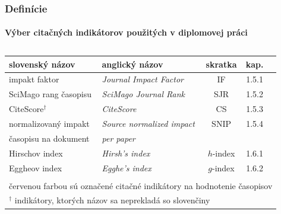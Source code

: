 \documentclass{beamer}
\begin{document}
\begin{frame}
  \frametitle{Definície}
  \framesubtitle{Výber citačných indikátorov použitých v diplomovej práci}

  \centering\small
  \begin{table}
  \begin{tabularx}{\textwidth}{llccr}
    \toprule\noalign{\vspace{.3ex}}
    slovenský  názov                     & anglický názov                         & skratka                 & kap.                 \\[0.3ex]
    \midrule\noalign{\vspace{.5ex}}
    {\color{red} impakt faktor}          & {\color{red}\emph{Journal Impact Factor}}           & IF                      &  1.5.1        \\[0.5ex]
    {\color{red} SciMago rang časopisu}  & {\color{red}\emph{SciMago Journal Rank}}            & SJR                     &  1.5.2       \\[0.5ex]
    {\color{red}CiteScore}$^\dagger$     & {\color{red}\emph{CiteScore}}                       & CS                      &  1.5.3       \\[0.5ex]
    {\color{red}normalizovaný impakt}    & {\color{red}\emph{Source normalized impact}}        & SNIP                    &  1.5.4      \\[-0.25ex]
    {\color{red}časopisu  na dokument}   & {\color{red}\emph{per paper}}                       &                         &                       \\[0.5ex]
    Hirschov index                       & \emph{Hirsh's index}                   & $h$-index               &  1.6.1    \\[1.5ex]
    Eggheov index                        & \emph{Egghe's index}                   & $g$-index               &  1.6.2    \\[0.5ex]
    \bottomrule \\ [-2ex]
    \multicolumn{5}{l}{\footnotesize {\color{red} červenou farbou} sú označené citačné indikátory na hodnotenie časopisov} \\
    \multicolumn{5}{l}{\footnotesize $^\dagger$ indikátory, ktorých názov sa neprekladá so slovenčiny}
  \end{tabularx}
    \caption{\citet{Szasz2017}}
  \end{table}
\end{frame}
\end{document}
